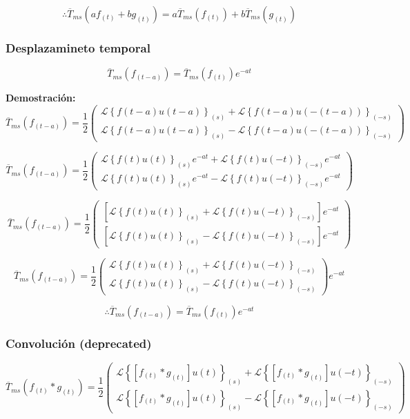 \documentclass[12pt]{article}
\begin{document}
$$
\therefore \overline{T}_{ms}(a f_{(t)} + b g_{(t)}) = a \overline{T}_{ms}(f_{(t)}) + b  \overline{T}_{ms}(g_{(t)})
$$

\subsubsection{Desplazamineto temporal}

\begin{equation}
 \overline{T}_{ms}(f_{(t-a)}) = \overline{T}_{ms}(f_{(t)}) e^{-at}
\label{desplazamiento_temporal}
\end{equation}

{\bfseries Demostración:}
$$\overline{T}_{ms}(f_{(t-a)}) = \frac12
\begin{pmatrix}
\mathcal{L}\left\{f(t-a)u(t-a)\right\}_{(s)} +  \mathcal{L}\left\{f(t-a)u(-(t-a))\right\}_{(-s)}\\[0.2 cm]
\mathcal{L}\left\{f(t-a)u(t-a)\right\}_{(s)} -  \mathcal{L}\left\{f(t-a)u(-(t-a))\right\}_{(-s)}
\end{pmatrix}$$


$$
\overline{T}_{ms}(f_{(t-a)}) = \frac12
\begin{pmatrix}
\mathcal{L}\left\{f(t)u(t)\right\}_{(s)} e^{-at} +  \mathcal{L}\left\{f(t)u(-t)\right\}_{(-s)} e^{-at} \\[0.2 cm]
\mathcal{L}\left\{f(t)u(t)\right\}_{(s)}  e^{-at} -  \mathcal{L}\left\{f(t)u(-t)\right\}_{(-s)} e^{-at} 
\end{pmatrix}
$$

$$
\overline{T}_{ms}(f_{(t-a)}) = \frac12
\begin{pmatrix}
\left[\mathcal{L}\left\{f(t)u(t)\right\}_{(s)} +  \mathcal{L}\left\{f(t)u(-t)\right\}_{(-s)}\right]e^{-at} \\[0.2 cm]
\left[\mathcal{L}\left\{f(t)u(t)\right\}_{(s)} -  \mathcal{L}\left\{f(t)u(-t)\right\}_{(-s)}\right]e^{-at} 
\end{pmatrix}
$$


$$
\overline{T}_{ms}(f_{(t-a)}) = \frac12
\begin{pmatrix}
\mathcal{L}\left\{f(t)u(t)\right\}_{(s)} +  \mathcal{L}\left\{f(t)u(-t)\right\}_{(-s)}\\[0.2 cm]
\mathcal{L}\left\{f(t)u(t)\right\}_{(s)} -  \mathcal{L}\left\{f(t)u(-t)\right\}_{(-s)}
\end{pmatrix} e^{-at}
$$

$$
\therefore \overline{T}_{ms}(f_{(t-a)}) = \overline{T}_{ms}(f_{(t)}) e^{-at}
$$

\subsubsection{Convolución (deprecated)}
\begin{equation}
\overline{T}_{ms}(f_{(t)} * g_{(t)}) = \frac12
\begin{pmatrix}
\mathcal{L}\left\{[f_{(t)} * g_{(t)}]u(t)\right\}_{(s)} +  \mathcal{L}\left\{[f_{(t)} * g_{(t)}]u(-t)\right\}_{(-s)}\\[0.2 cm]
\mathcal{L}\left\{[f_{(t)} * g_{(t)}]u(t)\right\}_{(s)} -  \mathcal{L}\left\{[f_{(t)} * g_{(t)}]u(-t)\right\}_{(-s)}
\end{pmatrix}
\end{equation}
\end{document}
